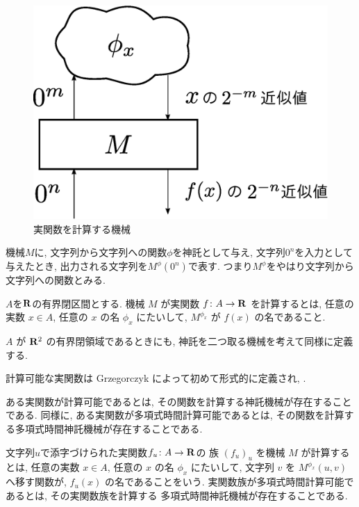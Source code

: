  \begin{figure}
  \label{fig:model-of-function}
  \begin{center}
   \includegraphics[height=0.15\textheight]{image/model-of-function.eps}
  \end{center}
  \caption{実関数を計算する機械}
 \end{figure}

機械$M$に, 
文字列から文字列への関数$\phi$を神託として与え, 
文字列$0 ^n$を入力として与えたとき, 
出力される文字列を$M ^\phi (0 ^n)$で表す. 
つまり$M ^\phi$をやはり文字列から文字列への関数とみる. 

\begin{definition}
$A$を$\mathbf R$の有界閉区間とする. 
機械 $M$ が実関数 $f \colon A \to \mathbf R$ を計算するとは,
任意の実数 $x \in A$, 任意の $x$ の名 $\phi_x$ にたいして,
$M^{\phi_x}$ が $f(x)$ の名であること.
\end{definition}

$A$ が $\mathbf R ^2$ の有界閉領域であるときにも, 
神託を二つ取る機械を考えて同様に定義する. 

 計算可能な実関数は Grzegorczyk によって初めて形式的に定義され,
 \cite{grzegorczyk1955computable}.

 ある実関数が計算可能であるとは, その関数を計算する神託機械が存在することである.
 同様に, ある実関数が多項式時間計算可能であるとは, その関数を計算する多項式時間神託機械が存在することである.

文字列$u$で添字づけられた実関数$f _u \colon A \to \mathbf R$の
族 $(f_u)_u$ を機械 $M$ が計算するとは,
任意の実数 $x \in A$, 任意の $x$ の名 $\phi_x$ にたいして,
文字列 $v$ を $M ^{\phi _x} (u, v)$ へ移す関数が, 
$f _u (x)$ の名であることをいう.
 実関数族が多項式時間計算可能であるとは, その実関数族を計算する
 多項式時間神託機械が存在することである.

